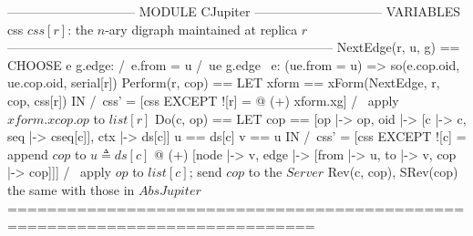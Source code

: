 \documentclass{article}
\begin{document}
\begin{tla}
------------------------------ MODULE CJupiter ------------------------------
VARIABLES css  \* $css[r]$: the $n$-ary digraph maintained at replica $r$
-----------------------------------------------------------------------------
NextEdge(r, u, g) == CHOOSE e \in g.edge: /\ e.from = u
                                          /\ \A ue \in g.edge \ {e}:
                           (ue.from = u) => so(e.cop.oid, ue.cop.oid, serial[r])
Perform(r, cop) == LET xform == xForm(NextEdge, r, cop, css[r])
                   IN  /\ css' = [css EXCEPT ![r] = @ (+) xform.xg]
                       /\ \* apply $xform.xcop.op$ to $list[r]$
Do(c, op) == LET cop == [op |-> op, oid |-> [c |-> c, seq |-> cseq[c]], ctx |-> ds[c]]
                   u == ds[c]    v == u 
             IN  /\ css' = [css EXCEPT ![c] = \* append $cop$ to $u \triangleq ds[c]$
                    @ (+) [node |-> {v}, edge |-> {[from |-> u, to |-> v, cop |-> cop]}]]
                 /\ \* apply $op$ to $list[c]$; send $cop$ to the $Server$
Rev(c, cop),  SRev(cop) \* the same with those in $AbsJupiter$
=============================================================================
\end{tla}
\end{document}
